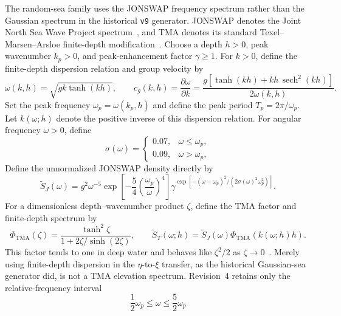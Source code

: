 \documentclass[11pt]{article}
\begin{document}
The random-sea family uses the JONSWAP frequency spectrum rather than the
Gaussian spectrum in the historical \texttt{v9} generator.  JONSWAP denotes
the Joint North Sea Wave Project spectrum~\cite{hasselmann1973}, and TMA
denotes its standard Texel--Marsen--Arsloe finite-depth
modification~\cite{bouws1985}.
Choose a depth $h>0$, peak wavenumber $k_p>0$, and peak-enhancement factor
$\gamma\geq1$.  For $k>0$, define the finite-depth dispersion relation and
group velocity by
\begin{equation}
  \omega(k,h)=\sqrt{gk\tanh(kh)},\qquad
  c_g(k,h)=\frac{\partial\omega}{\partial k}
  =\frac{g[\tanh(kh)+kh\,\operatorname{sech}^2(kh)]}
         {2\omega(k,h)}.
  \label{eq:group-velocity}
\end{equation}
Set the peak frequency $\omega_p=\omega(k_p,h)$ and define the peak period
$T_p=2\pi/\omega_p$.  Let $k(\omega;h)$ denote the positive inverse of this
dispersion relation.  For angular
frequency $\omega>0$, define
\begin{equation}
  \sigma(\omega)=
  \begin{cases}
    0.07,&\omega\leq\omega_p,\\
    0.09,&\omega>\omega_p,
  \end{cases}
  \label{eq:jonswap-width}
\end{equation}
Define the unnormalized JONSWAP density directly by
\begin{equation}
  \widetilde S_J(\omega)
  =g^2\omega^{-5}
    \exp\!\left[-\frac54\left(\frac{\omega_p}{\omega}\right)^4\right]
    \gamma^{\exp[-(\omega-\omega_p)^2/
      (2\sigma(\omega)^2\omega_p^2)]}.
  \label{eq:jonswap}
\end{equation}
For a dimensionless depth--wavenumber product $\zeta$, define the TMA factor
and finite-depth spectrum by
\begin{equation}
  \Phi_{\mathrm{TMA}}(\zeta)
  =\frac{\tanh^2\zeta}{1+2\zeta/\sinh(2\zeta)},\qquad
  \widetilde S_T(\omega;h)
  =\widetilde S_J(\omega)
    \Phi_{\mathrm{TMA}}(k(\omega;h)h).
  \label{eq:tma-factor}
\end{equation}
This factor tends to one in deep water and behaves like $\zeta^2/2$ as
$\zeta\to0$~\cite{bouws1985}.  Merely using finite-depth dispersion in the
$\eta$-to-$\xi$ transfer, as the historical Gaussian-sea generator did, is not a TMA
elevation spectrum.
Revision~4 retains only the relative-frequency interval
\begin{equation}
  \frac12\omega_p\leq\omega\leq\frac52\omega_p
  \label{eq:jonswap-relative-frequency-support}
\end{equation}
\end{document}
